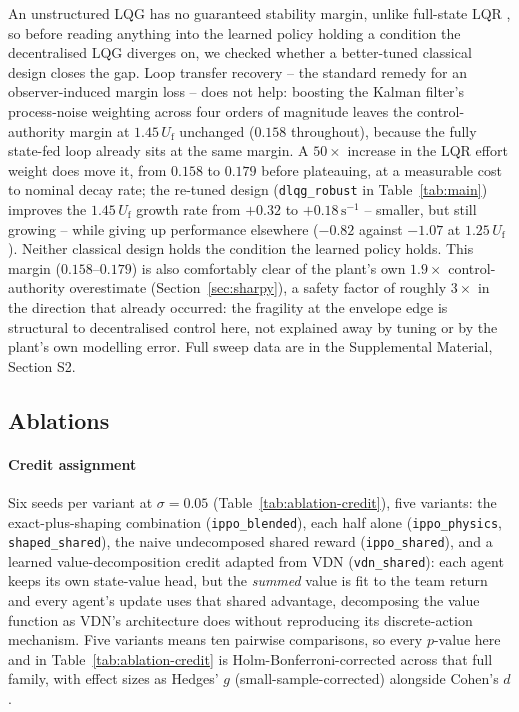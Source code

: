 \documentclass[preprint,11pt]{elsarticle}
\newcommand{\Uf}{U_{\mathrm{f}}}
\begin{document}
An unstructured LQG has no guaranteed stability margin, unlike full-state
LQR \cite{doyle1978guaranteed}, so before reading anything into the learned
policy holding a condition the decentralised LQG diverges on, we checked
whether a better-tuned classical design closes the gap. Loop transfer
recovery \cite{doylestein1981ltr} -- the standard remedy for an
observer-induced margin loss -- does not help: boosting the Kalman
filter's process-noise weighting across four orders of magnitude leaves the
control-authority margin at $1.45\,\Uf$ unchanged ($0.158$ throughout),
because the fully state-fed loop already sits at the same margin. A
$50\times$ increase in the LQR effort weight does move it, from $0.158$ to
$0.179$ before plateauing, at a measurable cost to nominal decay rate; the
re-tuned design (\texttt{dlqg\_robust} in Table~\ref{tab:main}) improves the
$1.45\,\Uf$ growth rate from $+0.32$ to $+0.18\,\mathrm{s}^{-1}$ -- smaller,
but still growing -- while giving up performance elsewhere ($-0.82$ against
$-1.07$ at $1.25\,\Uf$). Neither classical design holds the condition the
learned policy holds. This margin ($0.158$--$0.179$) is also comfortably
clear of the plant's own $1.9\times$ control-authority overestimate
(Section~\ref{sec:sharpy}), a safety factor of roughly $3\times$ in the
direction that already occurred: the fragility at the envelope edge is
structural to decentralised control here, not explained away by tuning or
by the plant's own modelling error. Full sweep data are in the Supplemental
Material, Section S2.

\subsection{Ablations}
\label{sec:ablations}

\paragraph{Credit assignment}
Six seeds per variant at $\sigma=0.05$ (Table~\ref{tab:ablation-credit}),
five variants: the exact-plus-shaping combination
(\texttt{ippo\_blended}), each half alone (\texttt{ippo\_physics},
\texttt{shaped\_shared}), the naive undecomposed shared reward
(\texttt{ippo\_shared}), and a learned value-decomposition credit adapted
from VDN \cite{sunehag2018vdn} (\texttt{vdn\_shared}): each agent keeps its
own state-value head, but the \emph{summed} value is fit to the team return
and every agent's update uses that shared advantage, decomposing the value
function as VDN's architecture does without reproducing its discrete-action
mechanism. Five variants means ten pairwise comparisons, so every $p$-value
here and in Table~\ref{tab:ablation-credit} is Holm-Bonferroni-corrected
across that full family, with effect sizes as Hedges' $g$
(small-sample-corrected) alongside Cohen's $d$.
\end{document}
